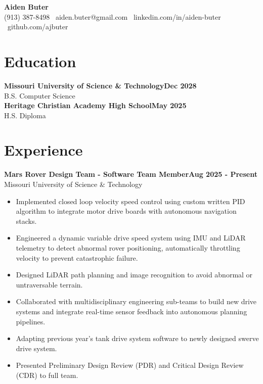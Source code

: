 \documentclass[11pt]{article}
\newcommand{\resumeEntry}[3]{
    \textbf{#1}\hfill\textbf{#2}\\#3
}
\begin{document}
\begin{center}
    {\Large\textbf{Aiden Buter}}\\[0.35em]
    (913) 387-8498 \textbar \ aiden.buter@gmail.com \textbar \  linkedin.com/in/aiden-buter \textbar \  github.com/ajbuter
\end{center}

\section*{Education}

\resumeEntry{Missouri University of Science \& Technology}{Dec 2028}{
B.S. Computer Science \hfill\\
}
\resumeEntry{Heritage Christian Academy High School}{May 2025}{
H.S. Diploma
}

\vspace{0.2em}

\section*{Experience}

\resumeEntry{Mars Rover Design Team - Software Team Member}{Aug 2025 - Present}{Missouri University of Science \& Technology}
\begin{itemize}
    \item[$\bullet$] Implemented closed loop velocity speed control using custom written PID algorithm to integrate motor drive boards with autonomous navigation stacks.
    \item[$\bullet$] Engineered a dynamic variable drive speed system using IMU and LiDAR telemetry to detect abnormal rover positioning, automatically throttling velocity to prevent catastrophic failure. 
    \item[$\bullet$] Designed LiDAR path planning and image recognition to avoid abnormal or untraversable terrain. 
    \item[$\bullet$] Collaborated with multidisciplinary engineering sub-teams to build new drive systems and integrate real-time sensor feedback into autonomous planning pipelines.
    \item[$\bullet$] Adapting previous year's tank drive system software to newly designed swerve drive system. 
    \item[$\bullet$] Presented Preliminary Design Review (PDR) and Critical Design Review (CDR) to full team.
\end{itemize}

\vspace{0.2em}
\end{document}
